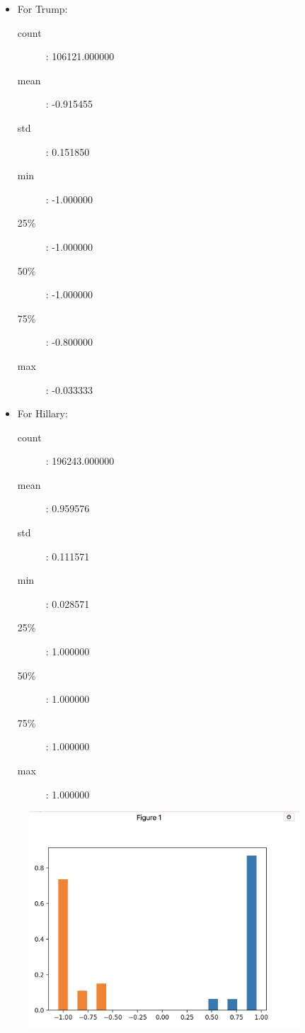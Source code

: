 \documentclass[12pt,a4paper]{article}
\begin{document}
    \begin{itemize}
      \item For Trump:
            \begin{description}
              \item[count]: 106121.000000
              \item[mean]: -0.915455
              \item[std]: 0.151850
              \item[min]: -1.000000
              \item[25\%]: -1.000000
              \item[50\%]: -1.000000
              \item[75\%]: -0.800000
              \item[max]: -0.033333
            \end{description}
      \item For Hillary:
            \begin{description}
              \item[count]: 196243.000000
              \item[mean]: 0.959576
              \item[std]: 0.111571
              \item[min]: 0.028571
              \item[25\%]: 1.000000
              \item[50\%]: 1.000000
              \item[75\%]: 1.000000
              \item[max]: 1.000000
            \end{description}
    \end{itemize}

    \begin{figure}[H]
      \includegraphics[width=0.9\textwidth]{figure.png}
      \centering
    \end{figure}
\end{document}
